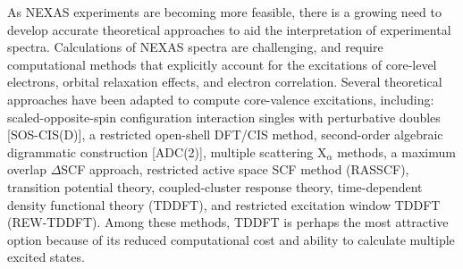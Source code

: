 \documentclass[8.5pt,twoside,twocolumn]{article}
\begin{document}
As NEXAS experiments are becoming more feasible, there is a growing need to develop accurate theoretical approaches to aid the interpretation of experimental spectra.
Calculations of NEXAS spectra are challenging, and require computational methods that explicitly account for the excitations of core-level electrons, orbital relaxation effects, and electron correlation. \cite{coriani_coupled-cluster_2012} Several theoretical approaches have been adapted to compute core-valence excitations, including: scaled-opposite-spin configuration interaction singles with perturbative doubles [SOS-CIS(D)],\cite{asmuruf_calculation_2008} a restricted open-shell DFT/CIS method,\cite{roemelt_excited_2013,roemelt_combined_2013} second-order algebraic digrammatic construction [ADC(2)],\cite{schirmer_beyond_1982,trofimov_efficient_1995} multiple scattering X$_\alpha$ methods, \cite{sheehy_correlation_1989} a maximum overlap $\Delta$SCF approach, \cite{besley_self-consistent-field_2009} restricted active space SCF method (RASSCF), \cite{agren_relaxation_1993} transition potential theory,\cite{triguero_calculations_1998} coupled-cluster response theory, \cite{coriani_coupled-cluster_2012} time-dependent density functional theory (TDDFT),\cite{stener_time_2003} and restricted excitation window TDDFT (REW-TDDFT). \cite{lopata_linear-response_2012} Among these methods, TDDFT is perhaps the most attractive option because of its reduced computational cost and ability to calculate multiple excited states.
\end{document}
